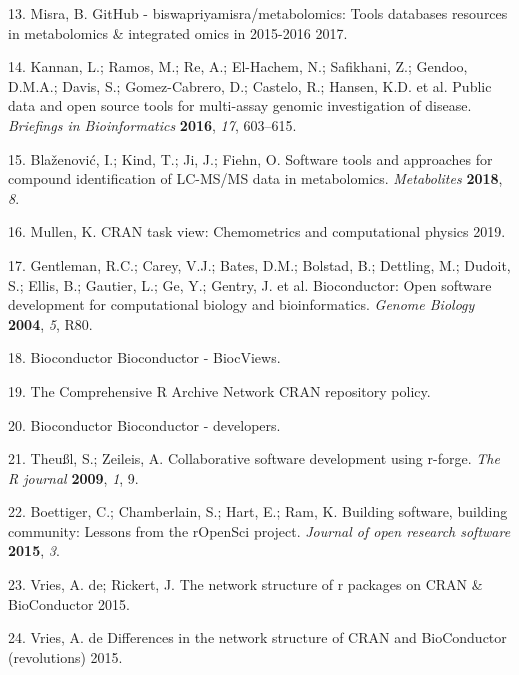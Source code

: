 \documentclass[]{article}
\begin{document}
\leavevmode\hypertarget{ref-misra_website_2017}{}%
13. Misra, B. GitHub - biswapriyamisra/metabolomics: Tools databases resources in metabolomics \& integrated omics in 2015-2016 2017.

\leavevmode\hypertarget{ref-kannan_2016}{}%
14. Kannan, L.; Ramos, M.; Re, A.; El-Hachem, N.; Safikhani, Z.; Gendoo, D.M.A.; Davis, S.; Gomez-Cabrero, D.; Castelo, R.; Hansen, K.D. et al. Public data and open source tools for multi-assay genomic investigation of disease. \emph{Briefings in Bioinformatics} \textbf{2016}, \emph{17}, 603--615.

\leavevmode\hypertarget{ref-blaenovi_2018}{}%
15. Blaženović, I.; Kind, T.; Ji, J.; Fiehn, O. Software tools and approaches for compound identification of LC-MS/MS data in metabolomics. \emph{Metabolites} \textbf{2018}, \emph{8}.

\leavevmode\hypertarget{ref-mullen_website_2019}{}%
16. Mullen, K. CRAN task view: Chemometrics and computational physics 2019.

\leavevmode\hypertarget{ref-gentleman_2004}{}%
17. Gentleman, R.C.; Carey, V.J.; Bates, D.M.; Bolstad, B.; Dettling, M.; Dudoit, S.; Ellis, B.; Gautier, L.; Ge, Y.; Gentry, J. et al. Bioconductor: Open software development for computational biology and bioinformatics. \emph{Genome Biology} \textbf{2004}, \emph{5}, R80.

\leavevmode\hypertarget{ref-bioconductor_website_nda}{}%
18. Bioconductor Bioconductor - BiocViews.

\leavevmode\hypertarget{ref-thecomprehensiverarchivenetwork_website_nd}{}%
19. The Comprehensive R Archive Network CRAN repository policy.

\leavevmode\hypertarget{ref-bioconductor_website_nd}{}%
20. Bioconductor Bioconductor - developers.

\leavevmode\hypertarget{ref-theul_2009}{}%
21. Theußl, S.; Zeileis, A. Collaborative software development using r-forge. \emph{The R journal} \textbf{2009}, \emph{1}, 9.

\leavevmode\hypertarget{ref-boettiger_2015}{}%
22. Boettiger, C.; Chamberlain, S.; Hart, E.; Ram, K. Building software, building community: Lessons from the rOpenSci project. \emph{Journal of open research software} \textbf{2015}, \emph{3}.

\leavevmode\hypertarget{ref-devries_website_2015b}{}%
23. Vries, A. de; Rickert, J. The network structure of r packages on CRAN \& BioConductor 2015.

\leavevmode\hypertarget{ref-devries_website_2015a}{}%
24. Vries, A. de Differences in the network structure of CRAN and BioConductor (revolutions) 2015.
\end{document}
